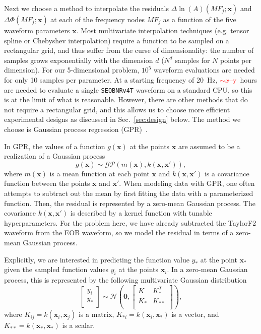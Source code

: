 \documentclass[prd,aps,letter,twocolumn,floatfix,notitlepage,nofootinbib]{revtex4-1}
\def\bx{\mathbf{x}}
\newcommand{\red}[1]{\textcolor{red}{#1}}
\begin{document}
Next we choose a method to interpolate the residuals $\Delta\ln(A)(MF_j; \bx)$ and $\Delta\Phi(MF_j; \bx)$ at each of the frequency nodes $MF_j$ as a function of the five waveform parameters $\bx$. Most multivariate interpolation techniques (e.g. tensor spline or Chebyshev interpolation) require a function to be sampled on a rectangular grid, and thus suffer from the curse of dimensionality: the number of samples grows exponentially with the dimension $d$ ($N^d$ samples for $N$ points per dimension). For our 5-dimensional problem, $10^5$ waveform evaluations are needed for only 10 samples per parameter. At a starting frequency of 20~Hz, \red{$\sim x$--y}~hours are needed to evaluate a single \texttt{SEOBNRv4T} waveform on a standard CPU, so this is at the limit of what is reasonable. However, there are other methods that do not require a rectangular grid, and this allows us to choose more efficient experimental designs as discussed in Sec.~\ref{sec:design} below. The method we choose is Gaussian process regression (GPR)~\cite{RasmussenWilliams2006}.

In GPR, the values of a function $g(\bx)$ at the points $\bx$ are assumed to be a realization of a Gaussian process
\begin{equation}
g(\bx) \sim \mathcal{GP}(m(\bx), k(\bx, \bx')),
\end{equation}
where $m(\bx)$ is a mean function at each point $\bx$ and $k(\bx, \bx')$ is a covariance function between the points $\bx$ and $\bx'$.
When modeling data with GPR, one often attempts to subtract out the mean by first fitting the data with a parameterized function. Then, the residual is represented by a zero-mean Gaussian process. The covariance $k(\bx, \bx')$ is described by a kernel function with tunable hyperparameters. For the problem here, we have already subtracted the TaylorF2 waveform from the EOB waveform, so we model the residual in terms of a zero-mean Gaussian process. 

Explicitly, we are interested in predicting the function value $y_*$ at the point $\bx_*$ given the sampled function values $y_i$ at the points $\bx_i$.  In a zero-mean Gaussian process, this is represented by the following multivariate Gaussian distribution
\begin{equation}
\label{eq:gaussian}
\begin{bmatrix}
y_i \\
y_* \\
\end{bmatrix}
\sim \mathcal{N}
\left({\bm 0}, 
\begin{bmatrix}
K & K_*^T \\
K_* & K_{**} \\
\end{bmatrix}
\right),
\end{equation}
where $K_{ij} = k(\bx_i, \bx_j)$ is a matrix, $K_{*i} = k(\bx_i, \bx_*)$ is a vector, and $K_{**} = k(\bx_*, \bx_*)$ is a scalar.
\end{document}
